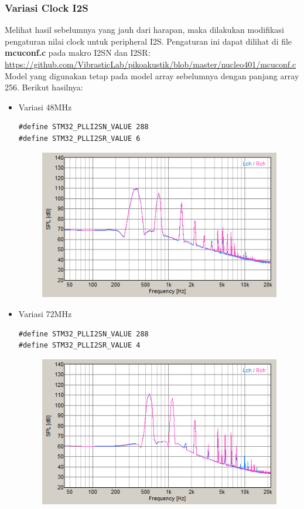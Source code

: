 \documentclass[12pt,]{article}
\begin{document}
  	\newpage
  	\subsubsection{Variasi Clock I2S}
  	Melihat hasil sebelumnya yang jauh dari harapan, maka dilakukan modifikasi
  	pengaturan nilai clock untuk peripheral I2S.
  	Pengaturan ini dapat dilihat di file \textbf{mcuconf.c} pada makro I2SN dan I2SR:\\
  	\url{https://github.com/VibrasticLab/pikoakustik/blob/master/nucleo401/mcuconf.c}\\
  	Model yang digunakan tetap pada model array sebelumnya dengan panjang array 256.
  	Berikut hasilnya:
  	\begin{itemize}
  		\item Variasi 48MHz
  		\begin{verbatim}
#define STM32_PLLI2SN_VALUE 288
#define STM32_PLLI2SR_VALUE 6
  		\end{verbatim}
  		\begin{figure}[H]
  			\centering
  			\includegraphics[width=0.45\linewidth]{result/day_2/sine_clk48}
  		\end{figure}
  	
  		\item Variasi 72MHz
  		\begin{verbatim}
#define STM32_PLLI2SN_VALUE 288
#define STM32_PLLI2SR_VALUE 4
  		\end{verbatim}
  		\begin{figure}[H]
  			\centering
  			\includegraphics[width=0.45\linewidth]{result/day_2/sine_clk72}
  		\end{figure}
  	

\end{itemize}
\end{document}
